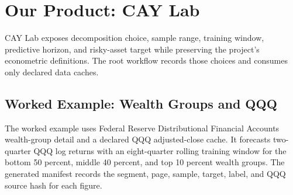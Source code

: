 \section{Our Product: CAY Lab}
\label{sec:our_product_cay_lab}

CAY Lab exposes decomposition choice, sample range, training window,
predictive horizon, and risky-asset target while preserving the project's
econometric definitions. The root workflow records those choices and consumes
only declared data caches.

\subsection{Worked Example: Wealth Groups and QQQ}

The worked example uses Federal Reserve Distributional Financial Accounts
wealth-group detail and a declared QQQ adjusted-close cache. It forecasts
two-quarter QQQ log returns with an eight-quarter rolling training window for
the bottom 50 percent, middle 40 percent, and top 10 percent wealth groups.
The generated manifest records the segment, page, sample, target, label, and
QQQ source hash for each figure.


